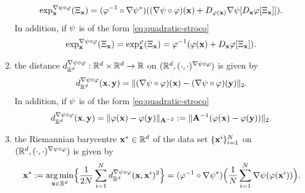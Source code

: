 \begin{proposition}
\begin{enumerate}[label=(\roman*)]
            \begin{equation}
                 \exp^{\nabla \psi \circ \varphi}_{\mathbf{x}} (\Xi_{\mathbf{x}}) = (\varphi^{-1} \circ\nabla \psi^*)((\nabla \psi \circ \varphi)(\mathbf{x}) + D_{\varphi(\mathbf{x})} \nabla \psi [ D_{\mathbf{x}} \varphi[\Xi_{\mathbf{x}}] ]).
                 \label{eq:thm-exp-remetrized}
            \end{equation}
            In addition, if $\psi$ is of the form \ref{eq:quadratic-stroco}
            \begin{equation}
                 \exp^{\nabla \psi \circ \varphi}_{\mathbf{x}} (\Xi_{\mathbf{x}}) = \exp^\varphi_{\mathbf{x}} (\Xi_{\mathbf{x}}) = \varphi^{-1}(\varphi(\mathbf{x}) + D_{\mathbf{x}} \varphi[\Xi_{\mathbf{x}}]).
                 \label{eq:thm-exp-remetrized-special-psi}
            \end{equation}
            \item the distance $d^{\nabla \psi \circ \varphi}_{\mathbb{R}^d}:\mathbb{R}^d \times\mathbb{R}^d \to \mathbb{R}$ on $(\mathbb{R}^d, (\cdot,\cdot)^{\nabla \psi \circ \varphi})$ is given by 
            \begin{equation}
                d^{\nabla \psi \circ \varphi}_{\mathbb{R}^d}(\mathbf{x}, \mathbf{y}) = \|(\nabla \psi \circ \varphi)(\mathbf{x}) - (\nabla \psi \circ \varphi)(\mathbf{y})\|_2.
                \label{eq:thm-distance-remetrized}
            \end{equation}
            In addition, if $\psi$ is of the form \ref{eq:quadratic-stroco}
            \begin{equation}
                d^{\nabla \psi \circ \varphi}_{\mathbb{R}^d}(\mathbf{x}, \mathbf{y}) = \| \varphi(\mathbf{x}) -  \varphi(\mathbf{y})\|_{\mathbf{A}^{-2}} := \| \mathbf{A}^{-1} (\varphi(\mathbf{x}) -  \varphi(\mathbf{y}))\|_{2}.
                \label{eq:thm-distance-remetrized-special-psi}
            \end{equation}
            \item the Riemannian barycentre $\mathbf{x}^* \in \mathbb{R}^d$ of the data set $\{\mathbf{x}^i\}_{i=1}^N$ on $(\mathbb{R}^d, (\cdot,\cdot)^{\nabla \psi \circ \varphi})$ is given by
            \begin{equation}
                \Vector^* := \argmin_{\Vector\in \Real^\dimInd} \Bigl\{ \frac{1}{2\dataPointNum}\sum_{\sumIndA = 1}^\dataPointNum \distance_{\Real^\dimInd}^{\nabla\stroco\circ\diffeo}(\Vector, \Vector^\sumIndA)^2 \Bigr\} = (\diffeo^{-1} \circ\nabla \stroco^*)\Bigl(\frac{1}{\dataPointNum} \sum_{\sumIndA=1}^\dataPointNum \nabla \stroco(\diffeo(\Vector^\sumIndA)) \Bigr).

\end{equation}
\end{enumerate}
\end{proposition}
